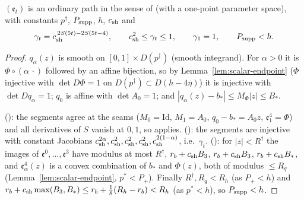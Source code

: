 \begin{lemma}\label{lem:scalar-ordinary}
$(\mathfrak e_t)$ is an ordinary path in the sense of  (with a one-point
parameter space), with constants $p^\dagger$, $P_{\rm supp}$, $h$, $c_{\rm sh}$ and
\[
 \gamma_t=c_{\rm sh}^{\,2S(5t)-2S(5t-4)},\qquad c_{\rm sh}^2\le\gamma_t\le1,\qquad\gamma_1=1,
 \qquad P_{\rm supp}<h.
\]
{\normalfont {}}
\end{lemma}

\begin{proof}
$q_\alpha(z)$ is smooth on $[0,1]\times D(p^\dagger)$ (smooth integrand). For $\alpha>0$ it is $\Phi\circ(\alpha\,\cdot)$ followed by an affine bijection, so by Lemma~\ref{lem:scalar-endpoint} ($\Phi$ injective with $\det D\Phi=1$ on $D(p^\dagger)\subset D(h-4\eta)$) it is injective with $\det Dq_\alpha=1$; $q_0$ is affine with $\det A_0=1$; and $|q_\alpha(z)-b_*|\le M_\Phi|z|\le B_*$.

(): the segments agree at the seams ($M_0=\mathrm{Id}$, $M_1=A_0$, $q_0-b_*=A_0z$, $\mathfrak e^4_1=\Phi$) and all derivatives of $S$ vanish at $0,1$, so  applies. (): the segments are injective with constant Jacobians $c_{\rm sh}^{2\alpha},c_{\rm sh}^2,c_{\rm sh}^2,c_{\rm sh}^2,c_{\rm sh}^{2(1-\alpha)}$, i.e.\ $\gamma_t$. (): for $|z|<R^\dagger$ the images of $\mathfrak e^0,\dots,\mathfrak e^3$ have modulus at most $R^\dagger$, $r_b+c_{\rm sh}B_3$, $r_b+c_{\rm sh}B_3$, $r_b+c_{\rm sh}B_*$, and $\mathfrak e^4_\alpha(z)$ is a convex combination of $b_*$ and $\Phi(z)$, both of modulus $\le R_q$ (Lemma~\ref{lem:scalar-endpoint}, $p^*<P_+$). Finally $R^\dagger,R_q<R_h$ (as $P_+<h$) and $r_b+c_{\rm sh}\max(B_3,B_*)\le r_b+\frac18(R_h-r_b)<R_h$ (as $p^*<h$), so $P_{\rm supp}<h$.
\end{proof}


